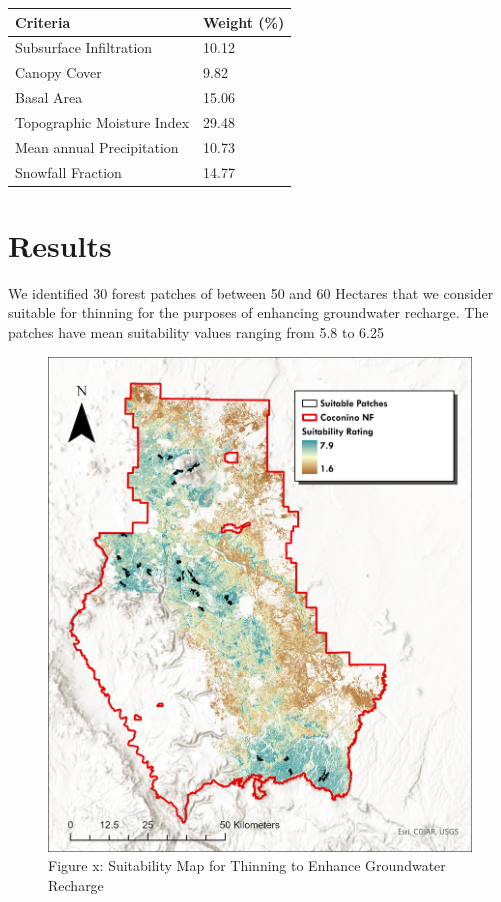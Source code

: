 \documentclass[
  number]{elsarticle}
\begin{document}
\begin{longtable}[]{@{}ll@{}}
\toprule\noalign{}
Criteria & Weight (\%) \\
\midrule\noalign{}
\endhead
\bottomrule\noalign{}
\endlastfoot
Subsurface Infiltration & 10.12 \\
Canopy Cover & 9.82 \\
Basal Area & 15.06 \\
Topographic Moisture Index & 29.48 \\
Mean annual Precipitation & 10.73 \\
Snowfall Fraction & 14.77 \\
\end{longtable}

\section{Results}\label{results}

We identified 30 forest patches of between 50 and 60 Hectares that we
consider suitable for thinning for the purposes of enhancing groundwater
recharge. The patches have mean suitability values ranging from 5.8 to
6.25

\begin{figure}[H]

{\centering \includegraphics{images/Thinning_Suitability_Map.jpg}

}

\caption{Figure x: Suitability Map for Thinning to Enhance Groundwater
Recharge}

\end{figure}%
\end{document}

